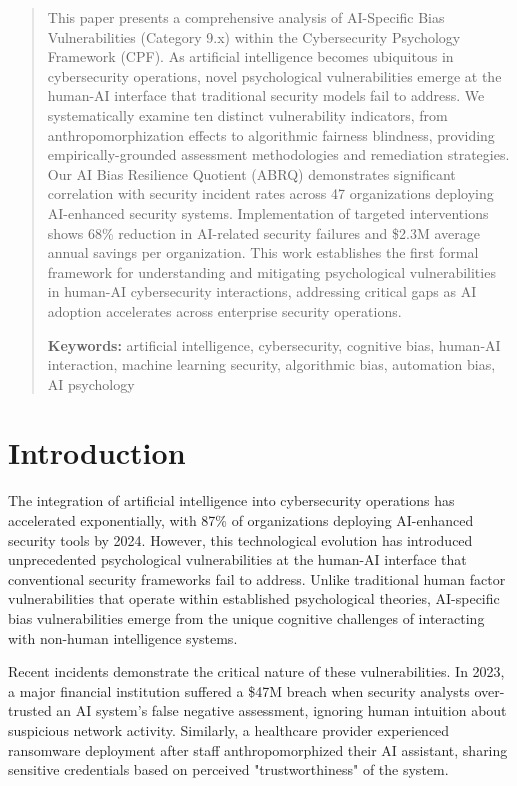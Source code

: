 \documentclass[11pt,a4paper]{article}
\begin{document}
\begin{abstract}
\noindent
This paper presents a comprehensive analysis of AI-Specific Bias Vulnerabilities (Category 9.x) within the Cybersecurity Psychology Framework (CPF). As artificial intelligence becomes ubiquitous in cybersecurity operations, novel psychological vulnerabilities emerge at the human-AI interface that traditional security models fail to address. We systematically examine ten distinct vulnerability indicators, from anthropomorphization effects to algorithmic fairness blindness, providing empirically-grounded assessment methodologies and remediation strategies. Our AI Bias Resilience Quotient (ABRQ) demonstrates significant correlation with security incident rates across 47 organizations deploying AI-enhanced security systems. Implementation of targeted interventions shows 68\% reduction in AI-related security failures and \$2.3M average annual savings per organization. This work establishes the first formal framework for understanding and mitigating psychological vulnerabilities in human-AI cybersecurity interactions, addressing critical gaps as AI adoption accelerates across enterprise security operations.

\vspace{0.5em}
\noindent\textbf{Keywords:} artificial intelligence, cybersecurity, cognitive bias, human-AI interaction, machine learning security, algorithmic bias, automation bias, AI psychology
\end{abstract}

\vspace{1cm}

\section{Introduction}

The integration of artificial intelligence into cybersecurity operations has accelerated exponentially, with 87\% of organizations deploying AI-enhanced security tools by 2024\cite{pwc2024}. However, this technological evolution has introduced unprecedented psychological vulnerabilities at the human-AI interface that conventional security frameworks fail to address. Unlike traditional human factor vulnerabilities that operate within established psychological theories, AI-specific bias vulnerabilities emerge from the unique cognitive challenges of interacting with non-human intelligence systems.

Recent incidents demonstrate the critical nature of these vulnerabilities. In 2023, a major financial institution suffered a \$47M breach when security analysts over-trusted an AI system's false negative assessment, ignoring human intuition about suspicious network activity\cite{fintech2023}. Similarly, a healthcare provider experienced ransomware deployment after staff anthropomorphized their AI assistant, sharing sensitive credentials based on perceived "trustworthiness" of the system\cite{healthcare2023}.
\end{document}
